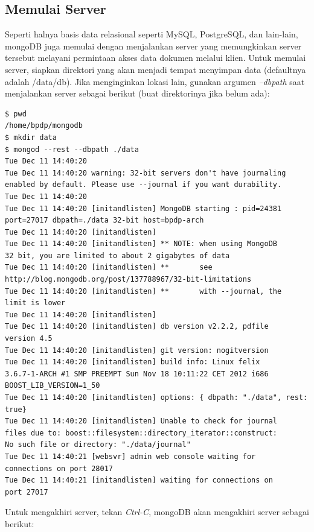 \subsection{Memulai Server}
Seperti halnya basis data relasional seperti MySQL, PostgreSQL, dan lain-lain, mongoDB juga memulai dengan menjalankan server yang memungkinkan server tersebut melayani permintaan akses data dokumen melalui klien. Untuk memulai server, siapkan direktori yang akan menjadi tempat menyimpan data (defaultnya adalah /data/db). Jika menginginkan lokasi lain, gunakan argumen \textit{--dbpath} saat menjalankan server sebagai berikut (buat direktorinya jika belum ada):

\lstset{language=bash,caption=Menjalankan server MongoDB (mongod)}
\begin{lstlisting}
$ pwd
/home/bpdp/mongodb
$ mkdir data
$ mongod --rest --dbpath ./data
Tue Dec 11 14:40:20 
Tue Dec 11 14:40:20 warning: 32-bit servers don't have journaling 
enabled by default. Please use --journal if you want durability.
Tue Dec 11 14:40:20 
Tue Dec 11 14:40:20 [initandlisten] MongoDB starting : pid=24381 
port=27017 dbpath=./data 32-bit host=bpdp-arch
Tue Dec 11 14:40:20 [initandlisten] 
Tue Dec 11 14:40:20 [initandlisten] ** NOTE: when using MongoDB 
32 bit, you are limited to about 2 gigabytes of data
Tue Dec 11 14:40:20 [initandlisten] **       see 
http://blog.mongodb.org/post/137788967/32-bit-limitations
Tue Dec 11 14:40:20 [initandlisten] **       with --journal, the 
limit is lower
Tue Dec 11 14:40:20 [initandlisten] 
Tue Dec 11 14:40:20 [initandlisten] db version v2.2.2, pdfile 
version 4.5
Tue Dec 11 14:40:20 [initandlisten] git version: nogitversion
Tue Dec 11 14:40:20 [initandlisten] build info: Linux felix 
3.6.7-1-ARCH #1 SMP PREEMPT Sun Nov 18 10:11:22 CET 2012 i686 
BOOST_LIB_VERSION=1_50
Tue Dec 11 14:40:20 [initandlisten] options: { dbpath: "./data", rest: true}
Tue Dec 11 14:40:20 [initandlisten] Unable to check for journal 
files due to: boost::filesystem::directory_iterator::construct: 
No such file or directory: "./data/journal"
Tue Dec 11 14:40:21 [websvr] admin web console waiting for 
connections on port 28017
Tue Dec 11 14:40:21 [initandlisten] waiting for connections on 
port 27017
\end{lstlisting}

Untuk mengakhiri server, tekan \textit{Ctrl-C}, mongoDB akan mengakhiri server sebagai berikut:

